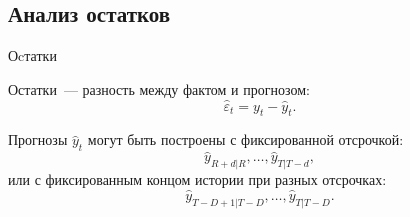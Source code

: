 \documentclass[9pt,pdf,utf8,hyperref={unicode},aspectratio=169]{beamer}
\begin{document}
\subsection{Анализ остатков}
\begin{frame}{Оcтатки}

	Остатки~--- разность между фактом и прогнозом:
	$$\hat{\varepsilon}_t = y_t - \hat{y}_t.$$
	
	\bigskip
	
	Прогнозы $\hat{y}_t$ могут быть построены с фиксированной отсрочкой:
	$$\hat{y}_{R+d|R}, \dots, \hat{y}_{T|T-d},$$
	или с фиксированным концом истории при разных отсрочках:
	$$\hat{y}_{T-D+1|T-D}, \dots,  \hat{y}_{T|T-D}.$$
\end{frame}
\end{document}
